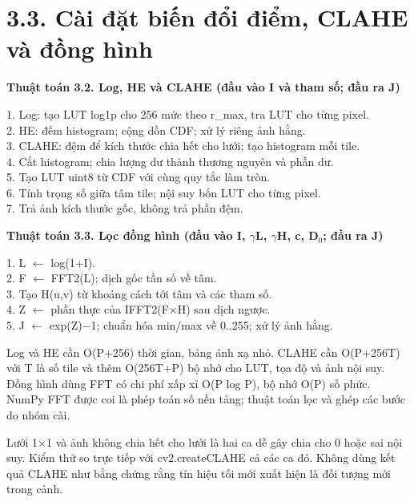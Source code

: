 \documentclass[12pt,a4paper]{extreport}
\begin{document}
\section*{3.3. Cài đặt biến đổi điểm,\allowbreak{} CLAHE và đồng hình}
\textbf{Thuật toán 3.2. Log,\allowbreak{} HE và CLAHE (đầu vào I và tham số; đầu ra J)}\par{\fontsize{10.5}{12}\selectfont\begin{flushleft}
1. Log: tạo LUT log1p cho 256 mức theo r\_max,\allowbreak{} tra LUT cho từng pixel.\\
2. HE: đếm histogram; cộng dồn CDF; xử lý riêng ảnh hằng.\\
3. CLAHE: đệm để kích thước chia hết cho lưới; tạo histogram mỗi tile.\\
4. Cắt histogram; chia lượng dư thành thương nguyên và phần dư.\\
5. Tạo LUT uint8 từ CDF với cùng quy tắc làm tròn.\\
6. Tính trọng số giữa tâm tile; nội suy bốn LUT cho từng pixel.\\
7. Trả ảnh kích thước gốc,\allowbreak{} không trả phần đệm.\\
\end{flushleft}}
\textbf{Thuật toán 3.3. Lọc đồng hình (đầu vào I,\allowbreak{} \ensuremath{\gamma}L,\allowbreak{} \ensuremath{\gamma}H,\allowbreak{} c,\allowbreak{} D\ensuremath{{}_0}; đầu ra J)}\par{\fontsize{10.5}{12}\selectfont\begin{flushleft}
1. L \ensuremath{\leftarrow} log(1+\allowbreak{}I).\\
2. F \ensuremath{\leftarrow} FFT2(L); dịch gốc tần số về tâm.\\
3. Tạo H(u,\allowbreak{}v) từ khoảng cách tới tâm và các tham số.\\
4. Z \ensuremath{\leftarrow} phần thực của IFFT2(F\ensuremath{\times}H) sau dịch ngược.\\
5. J \ensuremath{\leftarrow} exp(Z)\ensuremath{-}1; chuẩn hóa min/\allowbreak{}max về 0..255; xử lý ảnh hằng.\\
\end{flushleft}}
Log và HE cần O(P+\allowbreak{}256) thời gian,\allowbreak{} bảng ánh xạ nhỏ. CLAHE cần O(P+\allowbreak{}256T) với T là số tile và thêm O(256T+\allowbreak{}P) bộ nhớ cho LUT,\allowbreak{} tọa độ và ảnh nội suy. Đồng hình dùng FFT có chi phí xấp xỉ O(P log P),\allowbreak{} bộ nhớ O(P) số phức. NumPy FFT được coi là phép toán số nền tảng; thuật toán lọc và ghép các bước do nhóm cài.
\par
Lưới 1\ensuremath{\times}1 và ảnh không chia hết cho lưới là hai ca dễ gây chia cho 0 hoặc sai nội suy. Kiểm thử so trực tiếp với cv2.createCLAHE cả các ca đó. Không dùng kết quả CLAHE như bằng chứng rằng tín hiệu tối mới xuất hiện là đối tượng mới trong cảnh.
\par
\end{document}
